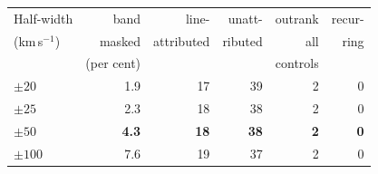 \begin{tabular}{@{}lrrrrr@{}}
\hline
Half-width & band & line- & unatt- & outrank & recur- \\
(km\,s$^{-1}$) & masked & attributed & ributed & all & ring \\
 & (per cent) & & & controls & \\
\hline
$\pm20$ & 1.9 & 17 & 39 & 2 & 0 \\
$\pm25$ & 2.3 & 18 & 38 & 2 & 0 \\
\textbf{$\pm50$} & \textbf{4.3} & \textbf{18} & \textbf{38} & \textbf{2} & \textbf{0} \\
$\pm100$ & 7.6 & 19 & 37 & 2 & 0 \\
\hline
\end{tabular}
